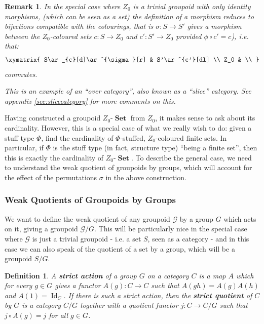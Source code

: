 \documentclass{amsart} \usepackage{amsmath,amssymb,bbm}
\newcommand{\opname}[1]{\operatorname{#1}}
\newtheorem{definition}{Definition}
\newcommand{\catname}[1]{\boldsymbol{\opname{{#1}}}}
\newcommand{\Set}{\catname{Set}}
\newtheorem{varremark}{Remark}
\newenvironment{remark}{\begin{varremark}\em}{\em\end{varremark}}
\begin{document}
\begin{remark}
  In the special case where $Z_0$ is a trivial groupoid with only
  identity morphisms, (which can be seen as a set) the definition of a
  morphism reduces to bijections compatible with the colourings, that
  is $\sigma : S \rightarrow S'$ gives a morphism between the
  $Z_0$-coloured sets $c : S \rightarrow Z_0$ and $c' : S' \rightarrow
  Z_0$ provided $\phi \circ c' = c$), i.e. that:
  \begin{equation}
    \xymatrix{    
      S\ar_{c}[d]\ar^{\sigma}[r] & S'\ar^{c'}[dl] \\
      Z_0 & \\
    }
  \end{equation}
  commutes.

  This is an example of an ``over category'', also known as a
  ``slice'' category.  See appendix \ref{sec:slicecategory} for more
  comments on this.
\end{remark}

Having constructed a groupoid $Z_0$-$\Set$ from $Z_0$, it makes sense
to ask about its cardinality.  However, this is a special case of what
we really wish to do: given a stuff type $\Phi$, find the cardinality
of $\Phi$-stuffed, $Z_0$-coloured finite sets.  In particular, if
$\Phi$ is the stuff type (in fact, structure type) ``being a finite
set'', then this is exactly the cardinality of $Z_0$-$\Set$.  To
describe the general case, we need to understand the weak quotient of
groupoids by groups, which will account for the effect of the
permutations $\sigma$ in the above construction.

\subsubsection{Weak Quotients of Groupoids by Groups}

We want to define the weak quotient of any groupoid $\mathcal{G}$ by a group
$G$ which acts on it, giving a groupoid $\mathcal{G} / G$.  This will be
particularly nice in the special case where $\mathcal{G}$ is just a trivial
groupoid - i.e. a set $S$, seen as a category - and in this case we can also
speak of the quotient of a set by a group, which will be a groupoid $S / G$.

\begin{definition}
  A {\textbf{strict action}} of a group $G$ on a category $C$ is a map $A$
  which for every $g \in G$ gives a functor $A ( g ) : C \rightarrow C$ such
  that $A ( g h ) = A ( g ) A ( h )$ and $A ( 1 ) = \opname{Id}_C$.  If there is
  such a strict action, then the {\textbf{strict quotient}} of $C$ by $G$ is
  a category $C / G$ together with a quotient functor $j : C \rightarrow C /
  G$ such that $j \circ A ( g ) = j$ for all $g \in G$.
\end{definition}
\end{document}

